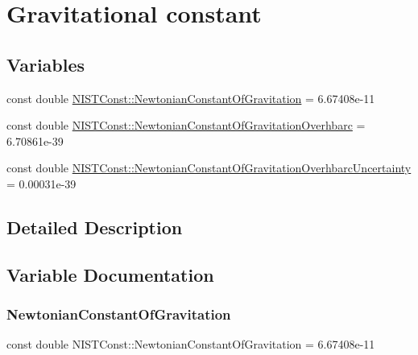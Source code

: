 \hypertarget{group___gravitational_constant}{}\section{Gravitational constant}
\label{group___gravitational_constant}
\subsection*{Variables}
\begin{DoxyCompactItemize}
\item 
const double \hyperlink{group___gravitational_constant_gaba6371307f4cebde50b3c61a07c724c5}{N\+I\+S\+T\+Const\+::\+Newtonian\+Constant\+Of\+Gravitation} = 6.\+67408e-\/11
\item 
const double \hyperlink{group___gravitational_constant_gad7c8d8ef09f60e8f3f36f86f98df0472}{N\+I\+S\+T\+Const\+::\+Newtonian\+Constant\+Of\+Gravitation\+Overhbarc} = 6.\+70861e-\/39
\item 
const double \hyperlink{group___gravitational_constant_gaf10cbbd8ad1ece4ec01e35fe3d86854f}{N\+I\+S\+T\+Const\+::\+Newtonian\+Constant\+Of\+Gravitation\+Overhbarc\+Uncertainty} = 0.\+00031e-\/39
\end{DoxyCompactItemize}


\subsection{Detailed Description}


\subsection{Variable Documentation}
\mbox{\label{group___gravitational_constant_gaba6371307f4cebde50b3c61a07c724c5}} 
\subsubsection{\texorpdfstring{Newtonian\+Constant\+Of\+Gravitation}{NewtonianConstantOfGravitation}}
{\footnotesize\ttfamily const double N\+I\+S\+T\+Const\+::\+Newtonian\+Constant\+Of\+Gravitation = 6.\+67408e-\/11}

